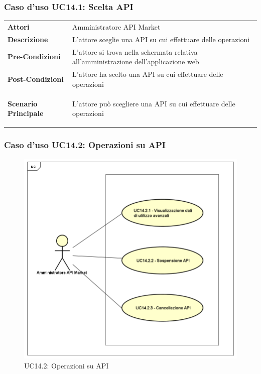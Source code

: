 \subsubsection{Caso d'uso UC14.1: Scelta API}
\label{UC14_1}

\begin{minipage}{\linewidth}
	\begin{tabular}{ l | p{11cm}}
		\hline
		\rowcolor{Gray}
		\multicolumn{2}{c}{UC14.1 - Scelta API} \\
		\hline
		\textbf{Attori} & Amministratore API Market \\
		\textbf{Descrizione} & L'attore sceglie una API su cui effettuare delle operazioni \\
		\textbf{Pre-Condizioni} & L'attore si trova nella schermata relativa all'amministrazione dell'applicazione web \\
		\textbf{Post-Condizioni} & L'attore ha scelto una API su cui effettuare delle operazioni \\
		\textbf{Scenario Principale} & 
		\begin{enumerate*}[label=(\arabic*.),itemjoin={\newline}]
			\item L'attore può scegliere una API su cui effettuare delle operazioni
		\end{enumerate*}\\
	\end{tabular}
\end{minipage}

\newpage
\subsubsection{Caso d'uso UC14.2: Operazioni su API}
\label{UC14_2}
\begin{figure}[ht]
	\centering
	\includegraphics[scale=0.45]{UML/UC14_2.png}
	\caption{UC14.2: Operazioni su API}
\end{figure}

